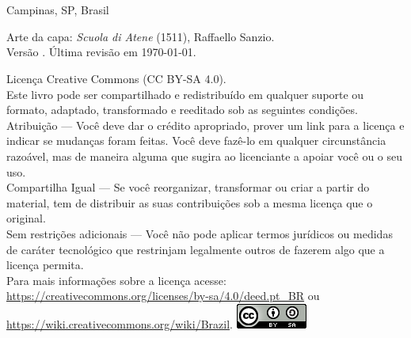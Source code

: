 \thispagestyle{empty}

\noindent
\autor \\
\href{mailto:\ecorreio{}}{\texttt{\ecorreio{}}}\\
Campinas, SP, Brasil

\vfill

\noindent Arte da capa: \textit{Scuola di Atene} (1511), Raffaello Sanzio.
\vspace*{0.5cm}\\
Versão \versao. Última revisão em \today.
\vspace*{0.5cm}\\
\begin{small}
\noindent
\ccLogo{} Licença Creative Commons (CC BY-SA 4.0).\\
Este livro pode ser compartilhado e redistribuído em qualquer suporte ou formato, adaptado, transformado e reeditado sob as seguintes condições.\\
Atribuição --- Você deve dar o crédito apropriado, prover um link para a licença e indicar se mudanças foram feitas. Você deve fazê-lo em qualquer circunstância razoável, mas de maneira alguma que sugira ao licenciante a apoiar você ou o seu uso.\\
Compartilha Igual --- Se você reorganizar, transformar ou criar a partir do material, tem de distribuir as suas contribuições sob a mesma licença que o original.\\
Sem restrições adicionais --- Você não pode aplicar termos jurídicos ou medidas de caráter tecnológico que restrinjam legalmente outros de fazerem algo que a licença permita.\\
Para mais informações sobre a licença acesse:\\
\url{https://creativecommons.org/licenses/by-sa/4.0/deed.pt_BR} ou\\
\url{https://wiki.creativecommons.org/wiki/Brazil}. \hfill
\includegraphics[height=\baselineskip]{./imagens/licenca.png}
\end{small}
